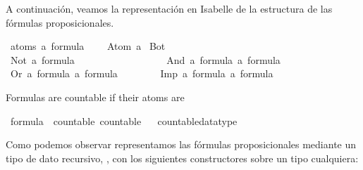 \begin{isabellebody}
\begin{isamarkuptext}
  A continuación, veamos la representación en Isabelle de la estructura
  de las fórmulas proposicionales.%
\end{isamarkuptext}\isamarkuptrue%
\isamarkupfalse%
\ {\isacharparenleft}atoms{\isacharcolon}\ {\isacharprime}a{\isacharparenright}\ formula\ {\isacharequal}\ \isanewline
\ \ Atom\ {\isacharprime}a\isanewline
{\isacharbar}\ Bot\ \ \ \ \ \ \ \ \ \ \ \ \ \ \ \ \ \ \ \ \ \ \ \ \ \ \ \ \ \ {\isacharparenleft}{\isachardoublequoteopen}{\isasymbottom}{\isachardoublequoteclose}{\isacharparenright}\ \ \isanewline
{\isacharbar}\ Not\ {\isachardoublequoteopen}{\isacharprime}a\ formula{\isachardoublequoteclose}\ \ \ \ \ \ \ \ \ \ \ \ \ \ \ \ \ {\isacharparenleft}{\isachardoublequoteopen}\isactrlbold {\isasymnot}{\isachardoublequoteclose}{\isacharparenright}\isanewline
{\isacharbar}\ And\ {\isachardoublequoteopen}{\isacharprime}a\ formula{\isachardoublequoteclose}\ {\isachardoublequoteopen}{\isacharprime}a\ formula{\isachardoublequoteclose}\ \ \ \ {\isacharparenleft}\ {\isachardoublequoteopen}\isactrlbold {\isasymand}{\isachardoublequoteclose}\ {}{}{\isacharparenright}\isanewline
{\isacharbar}\ Or\ {\isachardoublequoteopen}{\isacharprime}a\ formula{\isachardoublequoteclose}\ {\isachardoublequoteopen}{\isacharprime}a\ formula{\isachardoublequoteclose}\ \ \ \ \ {\isacharparenleft}\ {\isachardoublequoteopen}\isactrlbold {\isasymor}{\isachardoublequoteclose}\ {}{}{\isacharparenright}\isanewline
{\isacharbar}\ Imp\ {\isachardoublequoteopen}{\isacharprime}a\ formula{\isachardoublequoteclose}\ {\isachardoublequoteopen}{\isacharprime}a\ formula{\isachardoublequoteclose}\ \ \ \ {\isacharparenleft}\ {\isachardoublequoteopen}\isactrlbold {\isasymrightarrow}{\isachardoublequoteclose}\ {}{}{\isacharparenright}%
\begin{isamarkuptext}%
Formulas are countable if their atoms are%
\end{isamarkuptext}\isamarkuptrue%
\isamarkupfalse%
\ formula\ {\isacharcolon}{\isacharcolon}\ {\isacharparenleft}countable{\isacharparenright}\ countable%
\isadelimproof
\ %
\endisadelimproof
%
\isatagproof
{}\isamarkupfalse%
\ countable{\isacharunderscore}datatype%
\endisatagproof
{\isafoldproof}%
%
\isadelimproof
%
\endisadelimproof
%
\begin{isamarkuptext}%
Como podemos observar representamos las fórmulas proposicionales
  mediante un tipo de dato recursivo, , con los 
  siguientes constructores sobre un tipo cualquiera:


\end{isamarkuptext}
\end{isabellebody}
